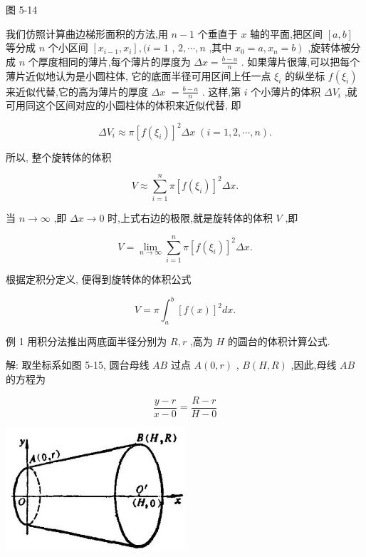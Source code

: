 \documentclass[10pt]{article}
\begin{document}
图 5-14

我们仿照计算曲边梯形面积的方法,用 \(n - 1\) 个垂直于 \(x\) 轴的平面,把区间 \(\left\lbrack {a,b}\right\rbrack\) 等分成 \(n\) 个小区间 \(\left\lbrack {{x}_{i - 1},{x}_{i}}\right\rbrack ,(i = 1\) , \(2,\cdots ,n\) ,其中 \(\left. {{x}_{0} = a,{x}_{n} = b}\right)\) ,旋转体被分成 \(n\) 个厚度相同的薄片,每个薄片的厚度为 \({\Delta x} = \frac{b - a}{n}\) . 如果薄片很薄,可以把每个薄片近似地认为是小圆柱体, 它的底面半径可用区间上任一点 \({\xi }_{i}\) 的纵坐标 \(f\left( {\xi }_{i}\right)\) 来近似代替,它的高为薄片的厚度 \({\Delta x}\) \(= \frac{b - a}{n}\) . 这样,第 \(i\) 个小薄片的体积 \(\Delta {V}_{i}\) ,就可用同这个区间对应的小圆柱体的体积来近似代替, 即

\[
\Delta {V}_{i} \approx \pi {\left\lbrack f\left( {\xi }_{i}\right) \right\rbrack }^{2}{\Delta x}\;\left( {i = 1,2,\cdots ,n}\right) .
\]

所以, 整个旋转体的体积

\[
V \approx \mathop{\sum }\limits_{{i = 1}}^{n}\pi {\left\lbrack f\left( {\xi }_{i}\right) \right\rbrack }^{2}{\Delta x}.
\]

当 \(n \rightarrow \infty\) ,即 \({\Delta x} \rightarrow 0\) 时,上式右边的极限,就是旋转体的体积 \(V\) ,即

\[
V = \mathop{\lim }\limits_{{n \rightarrow \infty }}\mathop{\sum }\limits_{{i = 1}}^{n}\pi {\left\lbrack f\left( {\xi }_{i}\right) \right\rbrack }^{2}{\Delta x}.
\]

根据定积分定义, 便得到旋转体的体积公式

\[
V = \pi {\int }_{a}^{b}{\left\lbrack f\left( x\right) \right\rbrack }^{2}{dx}.
\]

例 1 用积分法推出两底面半径分别为 \(R,r\) ,高为 \(H\) 的圆台的体积计算公式.

解: 取坐标系如图 5-15, 圆台母线 \({AB}\) 过点 \(A\left( {0,r}\right)\) , \(B\left( {H,R}\right)\) ,因此,母线 \({AB}\) 的方程为

\[
\frac{y - r}{x - 0} = \frac{R - r}{H - 0}
\]

\begin{center}
\includegraphics[max width=0.5\textwidth]{images/01912c18-5c3f-733d-b775-749ba9897a9d_237_214548.jpg}
\end{center}
\end{document}
